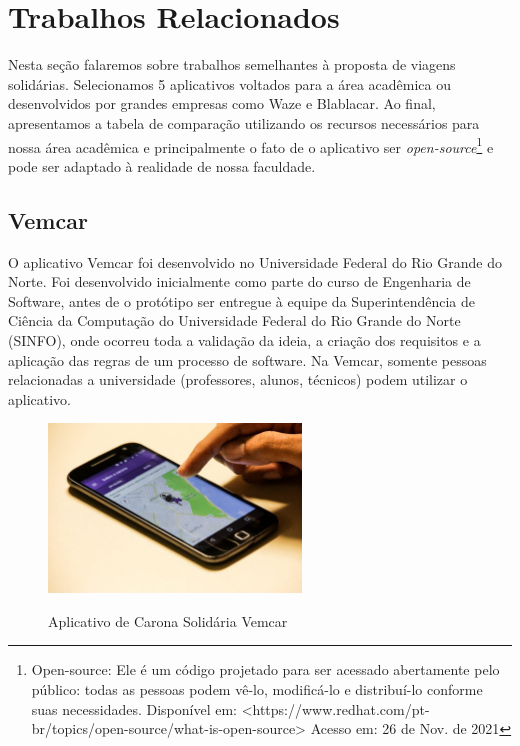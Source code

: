 \chapter{Trabalhos Relacionados}

Nesta seção falaremos sobre trabalhos semelhantes à proposta de viagens solidárias. Selecionamos 5 aplicativos voltados para a área acadêmica ou desenvolvidos por grandes empresas como Waze e Blablacar. Ao final, apresentamos a tabela de comparação utilizando os recursos necessários para nossa área acadêmica e principalmente o fato de o aplicativo ser \textit{open-source}\footnote{Open-source: Ele é um código projetado para ser acessado abertamente pelo público: todas as pessoas podem vê-lo, modificá-lo e distribuí-lo conforme suas necessidades. Disponível em: <https://www.redhat.com/pt-br/topics/open-source/what-is-open-source> Acesso em: 26 de Nov. de 2021} e pode ser adaptado à realidade de nossa faculdade.

\section{Vemcar}
O aplicativo Vemcar foi desenvolvido no Universidade Federal do Rio Grande do Norte. Foi desenvolvido inicialmente como parte do curso de Engenharia de Software, antes de o protótipo ser entregue à equipe da Superintendência de Ciência da Computação do Universidade Federal do Rio Grande do Norte (SINFO), onde ocorreu toda a validação da ideia, a criação dos requisitos e a aplicação das regras de um processo de software. Na Vemcar, somente pessoas relacionadas a universidade (professores, alunos, técnicos) podem utilizar o aplicativo.


\begin{figure}[!hbtp]
	\centering
	\caption{Aplicativo de Carona Solidária Vemcar}
	\includegraphics[width=0.6\textwidth]{./04-figuras/vemcar.jpg}
	\label{fig:tecnologia}
\end{figure}


